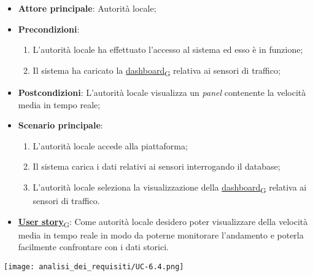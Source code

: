 \begin{itemize}
	\item \textbf{Attore principale}: Autorità locale;
	\item \textbf{Precondizioni}:
	      \begin{enumerate}
		      \item L'autorità locale ha effettuato l'accesso al sistema ed esso è in funzione;
		      \item Il sistema ha caricato la \href{https://7last.github.io/docs/rtb/documentazione-interna/glossario\#dashboard}{dashboard\textsubscript{G}} relativa ai sensori di traffico;
	      \end{enumerate}
	\item \textbf{Postcondizioni}: L'autorità locale visualizza un \textit{panel} contenente la velocità media in tempo reale;
	\item \textbf{Scenario principale}:
	      \begin{enumerate}
		      \item L'autorità locale accede alla piattaforma;
		      \item Il sistema carica i dati relativi ai sensori interrogando il database;
		      \item L'autorità locale seleziona la visualizzazione della \href{https://7last.github.io/docs/rtb/documentazione-interna/glossario\#dashboard}{dashboard\textsubscript{G}} relativa ai sensori di traffico.
	      \end{enumerate}
	\item \href{https://7last.github.io/docs/rtb/documentazione-interna/glossario\#user-story}{\textbf{User story}\textsubscript{G}}:
	      Come autorità locale desidero poter visualizzare della velocità media in tempo reale in modo da poterne monitorare l'andamento
	      e poterla facilmente confrontare con i dati storici.
\end{itemize}
\begin{center}
	\texttt{[image: analisi\_dei\_requisiti/UC-6.4.png]}
\end{center}



